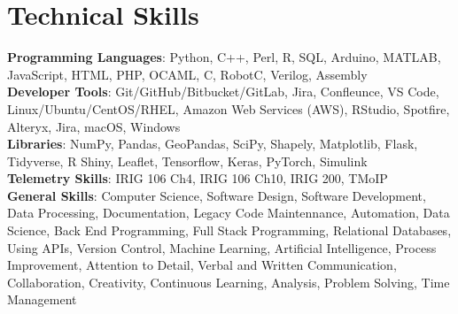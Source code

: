 \documentclass[a4paper,10pt]{article}
\begin{document}
\section{Technical Skills}
 \begin{itemize}[leftmargin=0.15in, label={}]
    \small{\item{
     \textbf{Programming Languages}{: Python, C++, Perl, R, SQL, Arduino, MATLAB, JavaScript, HTML, PHP, OCAML, C, RobotC, Verilog, Assembly} \\
     \textbf{Developer Tools}{: Git/GitHub/Bitbucket/GitLab, Jira, Confleunce, VS Code, Linux/Ubuntu/CentOS/RHEL, Amazon Web Services (AWS), RStudio, Spotfire, Alteryx, Jira, macOS, Windows} \\
     \textbf{Libraries}{: NumPy, Pandas, GeoPandas, SciPy, Shapely, Matplotlib, Flask, Tidyverse, R Shiny, Leaflet, Tensorflow, Keras, PyTorch, Simulink} \\
     \textbf{Telemetry Skills}{: IRIG 106 Ch4, IRIG 106 Ch10, IRIG 200, TMoIP} \\
     \textbf{General Skills}{: Computer Science, Software Design, Software Development, Data Processing, Documentation, Legacy Code Maintennance, Automation, Data Science, Back End Programming, Full Stack Programming, Relational Databases, Using APIs, Version Control, Machine Learning, Artificial Intelligence, Process Improvement, Attention to Detail, Verbal and Written Communication, Collaboration, Creativity, Continuous Learning, Analysis, Problem Solving, Time Management
    }}}
 \end{itemize}


\end{document}
